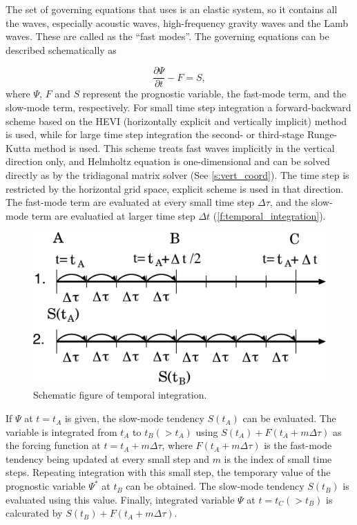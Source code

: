 The set of governing equations that \NICAM uses is an elastic system, so
it contains all the waves, especially acoustic waves, high-frequency
gravity waves and the Lamb waves.
These are called as the ``fast modes''.
The governing equations can be described schematically as

\begin{equation}
 \frac{\partial\Psi}{\partial t} - F = S,
\end{equation}
%
where $\Psi$, $F$ and $S$ represent the prognostic variable, the
fast-mode term, and the slow-mode term, respectively.
%
For small time step integration a forward-backward scheme based on the
HEVI (horizontally explicit and vertically implicit) method is used,
while for large time step integration the second- or third-stage
Runge-Kutta method \citep{Wicker:2002jd} is used.
%
This scheme treats fast waves implicitly in the vertical direction
only, and Helmholtz equation is one-dimensional and can be solved
directly as by the tridiagonal matrix solver (See \autoref{s:vert_coord}).
%
The time step is restricted by the horizontal grid space, explicit
scheme is used in that direction.
%
The fast-mode term are evaluated at every small time step $\Delta \tau$,
and the slow-mode term are evaluatied at larger time step $\Delta t$
(\autoref{f:temporal_integration}).
%


\begin{figure}[tb]
\centering
 \includegraphics[scale=.3]{figs/Tomita1-20-0.png}
\caption{Schematic figure of temporal integration.}
\label{f:temporal_integration}
\end{figure}

If $\Psi$ at $t = t_A$ is given, the slow-mode tendency $S(t_A)$ can be
evaluated.
%
The variable is integrated from $t_A$ to $t_B (> t_A)$ using
%
$S(t_A) + F(t_A + m\Delta\tau)$ as the forcing function at $t=t_A +
m\Delta\tau$,
where $F(t_A + m\Delta\tau)$ is the fast-mode tendency being updated at
every small step and $m$ is the index of small time steps.
%
Repeating integration with this small step, the temporary value of the
prognostic variable $\Psi^*$ at $t_B$ can be obtained.
%
The slow-mode tendency $S(t_B)$ is evaluated using this value.
%
Finally, integrated variable $\Psi$ at $t=t_C(>t_B)$ is calcurated by
$S(t_B) + F(t_A + m\Delta\tau)$.



